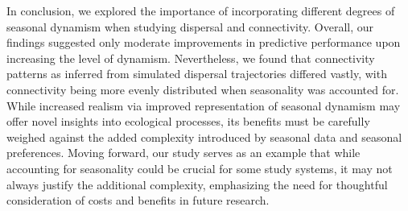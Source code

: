 \documentclass[../FinalThesis.tex]{subfiles}
\begin{document}


In conclusion, we explored the importance of incorporating different degrees of
seasonal dynamism when studying dispersal and connectivity. Overall, our
findings suggested only moderate improvements in predictive performance upon
increasing the level of dynamism. Nevertheless, we found that connectivity
patterns as inferred from simulated dispersal trajectories differed vastly, with
connectivity being more evenly distributed when seasonality was accounted for.
While increased realism via improved representation of seasonal dynamism may
offer novel insights into ecological processes, its benefits must be carefully
weighed against the added complexity introduced by seasonal data and seasonal
preferences. Moving forward, our study serves as an example that while
accounting for seasonality could be crucial for some study systems, it may not
always justify the additional complexity, emphasizing the need for thoughtful
consideration of costs and benefits in future research.

%
%
%
%
%

\end{document}
